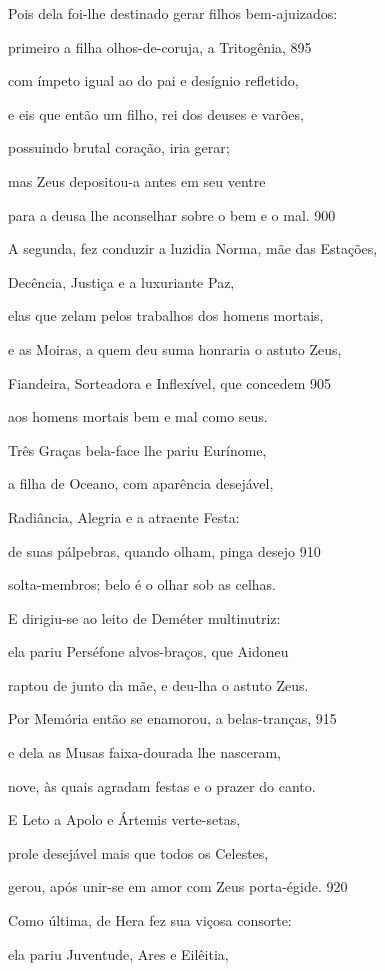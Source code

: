Pois dela foi-lhe destinado gerar filhos bem-ajuizados:

primeiro a filha olhos-de-coruja, a Tritogênia, \num{895}

com ímpeto igual ao do pai e desígnio refletido,

e eis que então um filho, rei dos deuses e varões,

possuindo brutal coração, iria gerar;

mas Zeus depositou-a antes em seu ventre

para a deusa lhe aconselhar sobre o bem e o mal. \num{900}

\quad{}A segunda, fez conduzir a luzidia Norma, mãe das Estações,

Decência, Justiça e a luxuriante Paz,

elas que zelam pelos trabalhos dos homens mortais,

e as Moiras, a quem deu suma honraria o astuto Zeus,

Fiandeira, Sorteadora e Inflexível, que concedem \num{905}

aos homens mortais bem e mal como seus.

\quad{}Três Graças bela-face lhe pariu Eurínome,

a filha de Oceano, com aparência desejável,

Radiância, Alegria e a atraente Festa:

de suas pálpebras, quando olham, pinga desejo \num{910}

solta-membros; belo é o olhar sob as celhas.

\quad{}E dirigiu-se ao leito de Deméter multinutriz:

ela pariu Perséfone alvos-braços, que Aidoneu

raptou de junto da mãe, e deu-lha o astuto Zeus.

\quad{}Por Memória então se enamorou, a belas-tranças, \num{915}

e dela as Musas faixa-dourada lhe nasceram,

nove, às quais agradam festas e o prazer do canto.

\quad{}E Leto a Apolo e Ártemis verte-setas,

prole desejável mais que todos os Celestes,

gerou, após unir-se em amor com Zeus porta-égide. \num{920}

\quad{}Como última, de Hera fez sua viçosa consorte:

ela pariu Juventude, Ares e Eilêitia,

